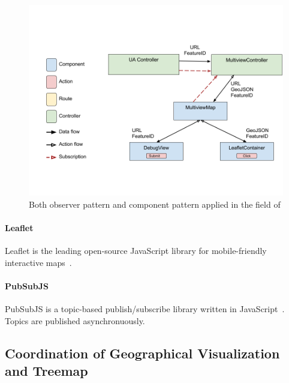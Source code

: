 \begin{figure}[h!]
  \centering
  \includegraphics[width=\textwidth]{images/both-patterns-implemented.png}
  \caption{%
    Both observer pattern and component pattern applied in the field of \cmvs{}
  }\label{fig:implementation:both-patterns}
\end{figure}


\paragraph{Leaflet}
Leaflet is the leading open-source JavaScript library for mobile-friendly interactive maps~\cite{Leaflet2017}.

\paragraph{PubSubJS}
PubSubJS is a topic-based publish/subscribe library written in JavaScript~\cite{PubSubJS2017}.
Topics are published asynchronuously.

\subsection{Coordination of Geographical Visualization and Treemap}


